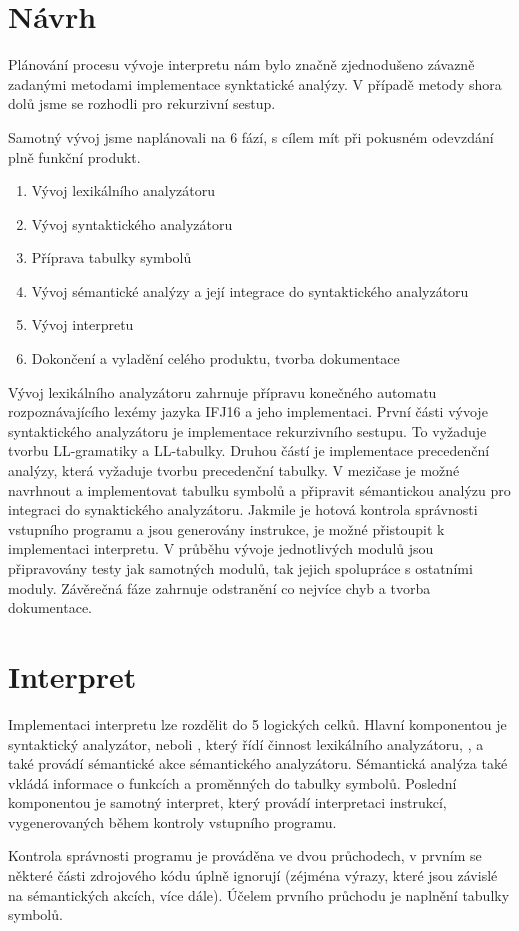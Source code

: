 \documentclass[a4paper, 11pt]{article}
\begin{document}
    \section{Návrh}
    Plánování procesu vývoje interpretu nám bylo značně zjednodušeno závazně zadanými metodami implementace synktatické analýzy. V případě metody shora dolů jsme se rozhodli pro rekurzivní sestup.\par
    Samotný vývoj jsme naplánovali na 6 fází, s cílem mít při pokusném odevzdání plně funkční produkt.
    \begin{enumerate}[itemsep=0mm]
        \item Vývoj lexikálního analyzátoru
        \item Vývoj syntaktického analyzátoru
        \item Příprava tabulky symbolů
        \item Vývoj sémantické analýzy a její integrace do syntaktického analyzátoru
        \item Vývoj interpretu
        \item Dokončení a vyladění celého produktu, tvorba dokumentace
    \end{enumerate}
    Vývoj lexikálního analyzátoru zahrnuje přípravu konečného automatu rozpoznávajícího lexémy jazyka IFJ16 a jeho implementaci. První části vývoje syntaktického analyzátoru je implementace rekurzivního sestupu. To vyžaduje tvorbu LL-gramatiky a LL-tabulky. Druhou částí je implementace precedenční analýzy, která vyžaduje tvorbu precedenční tabulky. V mezičase je možné navrhnout a implementovat tabulku symbolů a připravit sémantickou analýzu pro integraci do synaktického analyzátoru. Jakmile je hotová kontrola správnosti vstupního programu a jsou generovány instrukce, je možné přistoupit k implementaci interpretu. V průběhu vývoje jednotlivých modulů jsou připravovány testy jak samotných modulů, tak jejich spolupráce s ostatními moduly. Závěrečná fáze zahrnuje odstranění co nejvíce chyb a tvorba dokumentace.
    \section{Interpret}
    Implementaci interpretu lze rozdělit do 5 logických celků. Hlavní komponentou je syntaktický analyzátor, neboli , který řídí činnost lexikálního analyzátoru, , a také provádí sémantické akce sémantického analyzátoru. Sémantická analýza také vkládá informace o funkcích a proměnných do tabulky symbolů. Poslední komponentou je samotný interpret, který provádí interpretaci instrukcí, vygenerovaných během kontroly vstupního programu.\par
    Kontrola správnosti programu je prováděna ve dvou průchodech, v prvním se některé části zdrojového kódu úplně ignorují (zéjména výrazy, které jsou závislé na sémantických akcích, více dále). Účelem prvního průchodu je naplnění tabulky symbolů.
\end{document}
